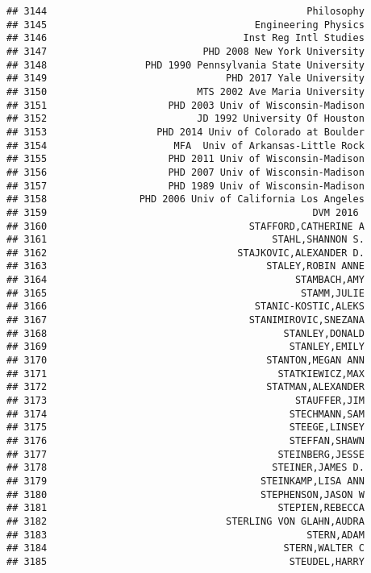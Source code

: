 \documentclass[
]{article}
\begin{document}
\begin{verbatim}
## 3144                                             Philosophy
## 3145                                    Engineering Physics
## 3146                                  Inst Reg Intl Studies
## 3147                           PHD 2008 New York University
## 3148                 PHD 1990 Pennsylvania State University
## 3149                               PHD 2017 Yale University
## 3150                          MTS 2002 Ave Maria University
## 3151                     PHD 2003 Univ of Wisconsin-Madison
## 3152                          JD 1992 University Of Houston
## 3153                   PHD 2014 Univ of Colorado at Boulder
## 3154                      MFA  Univ of Arkansas-Little Rock
## 3155                     PHD 2011 Univ of Wisconsin-Madison
## 3156                     PHD 2007 Univ of Wisconsin-Madison
## 3157                     PHD 1989 Univ of Wisconsin-Madison
## 3158                PHD 2006 Univ of California Los Angeles
## 3159                                              DVM 2016 
## 3160                                   STAFFORD,CATHERINE A
## 3161                                       STAHL,SHANNON S.
## 3162                                 STAJKOVIC,ALEXANDER D.
## 3163                                      STALEY,ROBIN ANNE
## 3164                                           STAMBACH,AMY
## 3165                                            STAMM,JULIE
## 3166                                    STANIC-KOSTIC,ALEKS
## 3167                                   STANIMIROVIC,SNEZANA
## 3168                                         STANLEY,DONALD
## 3169                                          STANLEY,EMILY
## 3170                                      STANTON,MEGAN ANN
## 3171                                        STATKIEWICZ,MAX
## 3172                                      STATMAN,ALEXANDER
## 3173                                           STAUFFER,JIM
## 3174                                          STECHMANN,SAM
## 3175                                          STEEGE,LINSEY
## 3176                                          STEFFAN,SHAWN
## 3177                                        STEINBERG,JESSE
## 3178                                       STEINER,JAMES D.
## 3179                                     STEINKAMP,LISA ANN
## 3180                                     STEPHENSON,JASON W
## 3181                                        STEPIEN,REBECCA
## 3182                               STERLING VON GLAHN,AUDRA
## 3183                                             STERN,ADAM
## 3184                                         STERN,WALTER C
## 3185                                          STEUDEL,HARRY

\end{verbatim}
\end{document}
